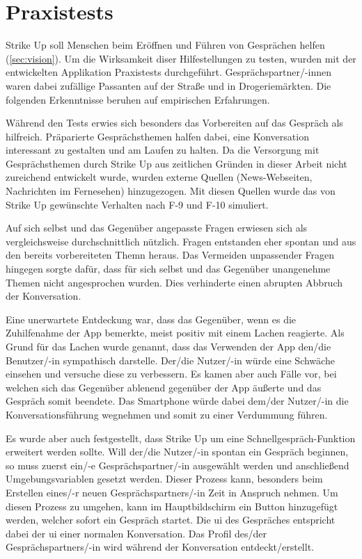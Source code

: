 \chapter{Praxistests}
\label{ch.praxistests}

Strike Up soll Menschen beim Eröffnen und Führen von Gesprächen helfen (\ref{sec:vision}). Um die Wirksamkeit diser Hilfestellungen zu testen, wurden mit der entwickelten Applikation Praxistests durchgeführt. \newline
Gesprächspartner/-innen waren dabei zufällige Passanten auf der Straße und in Drogeriemärkten. \newline
Die folgenden Erkenntnisse beruhen auf empirischen Erfahrungen.

Während den Tests erwies sich besonders das Vorbereiten auf das Gespräch als hilfreich. Präparierte Gesprächsthemen halfen dabei, eine Konversation interessant zu gestalten und am Laufen zu halten. \newline
Da die Versorgung mit Gesprächsthemen durch Strike Up aus zeitlichen Gründen in dieser Arbeit nicht zureichend entwickelt wurde, wurden externe Quellen (News-Webseiten, Nachrichten im Fernesehen) hinzugezogen. Mit diesen Quellen
wurde das von Strike Up gewünschte Verhalten nach F-9 und F-10 simuliert.

Auf sich selbst und das Gegenüber angepasste Fragen erwiesen sich als vergleichsweise durchschnittlich nützlich. Fragen entstanden eher spontan und aus den bereits vorbereiteten Themn heraus. \newline
Das Vermeiden unpassender Fragen hingegen sorgte dafür, dass für sich selbst und das Gegenüber unangenehme Themen nicht angesprochen wurden. Dies verhinderte einen abrupten Abbruch der Konversation.

Eine unerwartete Entdeckung war, dass das Gegenüber, wenn es die Zuhilfenahme der App bemerkte, meist positiv mit einem Lachen reagierte. Als Grund für das Lachen wurde genannt, dass das Verwenden der App den/die Benutzer/-in sympathisch darstelle. Der/die Nutzer/-in würde eine Schwäche einsehen und versuche diese zu verbessern. \newline
Es kamen aber auch Fälle vor, bei welchen sich das Gegenüber ablenend gegenüber der App äußerte und das Gespräch somit beendete. Das Smartphone würde dabei dem/der Nutzer/-in die Konversationsführung wegnehmen und somit zu einer Verdummung führen.

Es wurde aber auch festgestellt, dass Strike Up um eine Schnellgespräch-Funktion erweitert werden sollte. \newline
Will der/die Nutzer/-in spontan ein Gespräch beginnen, so muss zuerst ein/-e Gesprächspartner/-in ausgewählt werden und anschließend Umgebungsvariablen gesetzt werden. Dieser Prozess kann, besonders beim Erstellen eines/-r neuen Gesprächspartners/-in Zeit in Anspruch nehmen. \newline
Um diesen Prozess zu umgehen, kann im Hauptbildschirm ein Button hinzugefügt werden, welcher sofort ein Gespräch startet. Die \gls{ui} des Gespräches entspricht dabei der \gls{ui} einer normalen Konversation. Das Profil des/der Gesprächspartners/-in wird während der Konversation entdeckt/erstellt.